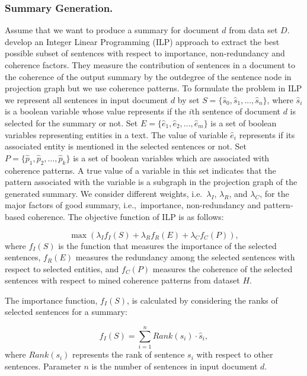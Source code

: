 \subsubsection{Summary Generation.}
Assume that we want to produce a summary for document $d$ from data set $D$. 
 develop an Integer Linear Programming (ILP) approach to extract the best possible subset of sentences with respect to importance, non-redundancy and coherence factors. 
They measure the contribution of sentences in a document to the coherence of the output summary by the outdegree of the sentence node in projection graph but we use coherence patterns. 
To formulate the problem in ILP we represent all sentences in input document $d$ by set 
$S = \lbrace \hat{s}_0, \hat{s}_1,..., \hat{s}_n \rbrace$, where $\hat{s}_i$ is a boolean variable whose value represents if the $i$th sentence of document $d$ is selected for the summary or not.  
Set $E=\lbrace \hat{e}_1, \hat{e}_2,..., \hat{e}_m \rbrace$ is a set of boolean variables representing entities in a text. 
The value of variable $\hat{e}_i$ represents if its associated entity is mentioned in the selected sentences or not. 
Set $P= \lbrace \hat{p}_1, \hat{p}_2,..., \hat{p}_k \rbrace$ is a set of boolean variables which are associated with coherence patterns. 
A true value of a variable in this set indicates that the pattern associated with the variable is a subgraph in the projection graph of the generated summary. 
We consider different weights, i.e.\ $\lambda_I$, $\lambda_R$, and $\lambda_C$, for the major factors of good summary, i.e.,\ importance, non-redundancy and pattern-based coherence.  
The objective function of ILP is as follows:

\begin{equation}
\max(\lambda_I f_I(S) + \lambda_R f_R(E) + \lambda_C f_C(P)),
\end{equation}
where $f_I(S)$ is the function that measures the importance of the selected sentences, $f_R(E)$ measures the redundancy among the selected sentences with respect to selected entities, and $f_C(P)$ measures the coherence of the selected sentences with respect to mined coherence patterns from dataset $H$. 

The importance function, $f_I(S)$, is calculated by considering the ranks of selected sentences for a summary:

\begin{equation}
f_I(S) = \sum_{i=1}^{n}{Rank(s_i) \cdot \hat{s}_i},
\end{equation}
where $Rank(s_i)$ represents the rank of sentence $s_i$ with respect to other sentences. 
Parameter $n$ is the number of sentences in input document $d$.  

